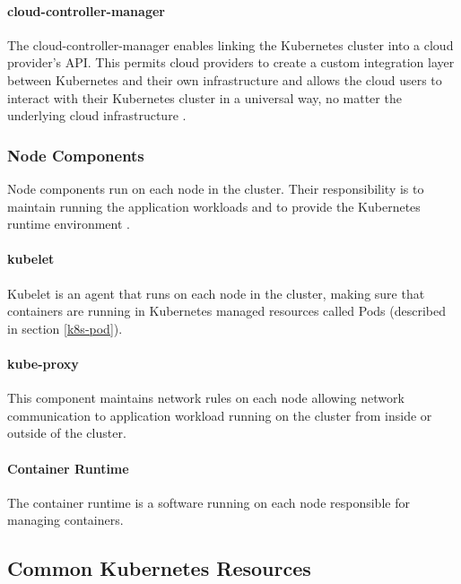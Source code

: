 \paragraph{cloud-controller-manager} The cloud-controller-manager enables linking the Kubernetes cluster into a cloud provider's API. This permits cloud providers to create a custom integration layer between Kubernetes and their own infrastructure and allows the cloud users to interact with their Kubernetes cluster in a universal way, no matter the underlying cloud infrastructure \cite{KubernetesArchitecture}.

\subsubsection{Node Components}

Node components run on each node in the cluster. Their responsibility is to maintain running the application workloads and to provide the Kubernetes runtime environment \cite{KubernetesArchitecture}.

\paragraph{kubelet} Kubelet is an agent that runs on each node in the cluster, making sure that containers are running in Kubernetes managed resources called Pods (described in section \ref{k8s-pod}).

\paragraph{kube-proxy} This component maintains network rules on each node allowing network communication to application workload running on the cluster from inside or outside of the cluster.

\paragraph{Container Runtime} The container runtime is a software running on each node responsible for managing containers.

\subsection{Common Kubernetes Resources}

